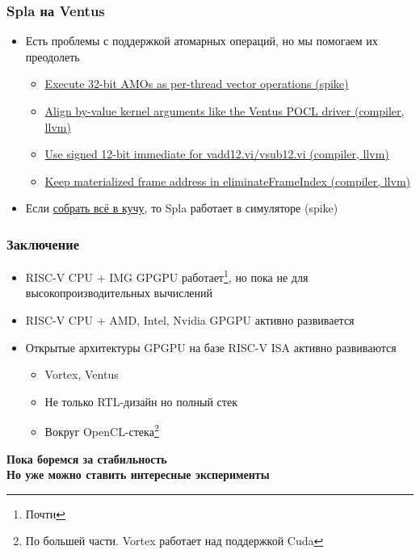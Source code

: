 \documentclass[xcolor=table,aspectratio=169]{beamer}
\begin{document}
\begin{frame}[fragile]
  \frametitle{Spla на Ventus}
  \begin{itemize}
    \item Есть проблемы с поддержкой атомарных операций, но мы помогаем их преодолеть
    \begin{itemize}
      \item[\faCheck] \href{https://github.com/THU-DSP-LAB/ventus-gpgpu-isa-simulator/pull/53}{Execute 32-bit AMOs as per-thread vector operations (spike)}
      \item[\faGears] \href{https://github.com/THU-DSP-LAB/llvm-project/pull/217}{Align by-value kernel arguments like the Ventus POCL driver (compiler, llvm)}
      \item[\faGears] \href{https://github.com/THU-DSP-LAB/llvm-project/pull/216}{Use signed 12-bit immediate for vadd12.vi/vsub12.vi (compiler, llvm)}
      \item[\faGears] \href{https://github.com/THU-DSP-LAB/llvm-project/pull/215}{Keep materialized frame address in eliminateFrameIndex (compiler, llvm)}
    \end{itemize}
    \pause
    \item Если \href{https://github.com/GoslingJr/ventus-env/tree/spla-fixes}{собрать всё в кучу}, то Spla работает в симуляторе (spike)
  \end{itemize}
\end{frame}

\begin{frame}[fragile]
  \frametitle{Заключение}  
  \begin{itemize}
    \item[\faCheck] RISC-V CPU + IMG GPGPU работает\footnote{Почти}, но пока не для высокопроизводительных вычислений 
    \item[\faGears] RISC-V CPU + AMD, Intel, Nvidia GPGPU активно развивается
    \pause
    \item[\faGears] Открытые архитектуры GPGPU на базе RISC-V ISA активно развиваются
    \begin{itemize}
      \item Vortex, Ventus
      \item Не только RTL-дизайн но полный стек
      \item Вокруг OpenCL-стека\footnote{По большей части. Vortex работает над поддержкой Cuda}
    \end{itemize}
  \end{itemize}
  \pause
  \begin{center}
    \textbf{Пока боремся за стабильность}\\
    \textbf{Но уже можно ставить интересные эксперименты}
  \end{center}
\end{frame}

\end{document}
